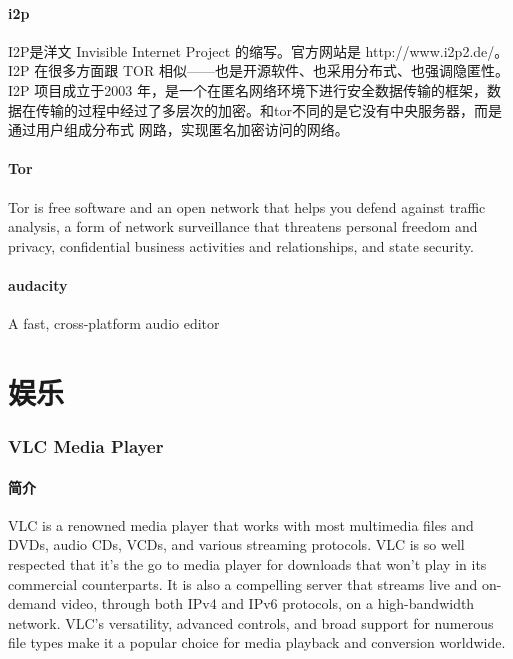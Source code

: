 \documentclass[paper=a4,fontsize=11pt]{article}
\begin{document}
	\subsection{i2p}
	
	I2P是洋文 Invisible Internet Project 的缩写。官方网站是 http://www.i2p2.de/。I2P 在很多方面跟 TOR 相似——也是开源软件、也采用分布式、也强调隐匿性。I2P 项目成立于2003 年，是一个在匿名网络环境下进行安全数据传输的框架，数据在传输的过程中经过了多层次的加密。和tor不同的是它没有中央服务器，而是通过用户组成分布式 网路，实现匿名加密访问的网络。
	
	\subsection{Tor}
	
	Tor is free software and an open network that helps you defend against traffic analysis, a form of network surveillance that threatens personal freedom and privacy, confidential business activities and relationships, and state security.
	
	
	\subsection{audacity}
	
	A fast, cross-platform audio editor
	
	\clearpage
	
	\part{娱乐}
	
	\clearpage
	
	\section{VLC Media Player}	
	
	\subsection{简介}
	VLC is a renowned media player that works with most multimedia files and DVDs, audio CDs, VCDs, and various streaming protocols. VLC is so well respected that it’s the go to media player for downloads that won’t play in its commercial counterparts. It is also a compelling server that streams live and on-demand video, through both IPv4 and IPv6 protocols, on a high-bandwidth network. VLC’s versatility, advanced controls, and broad support for numerous file types make it a popular choice for media playback and conversion worldwide. 
	
\end{document}
